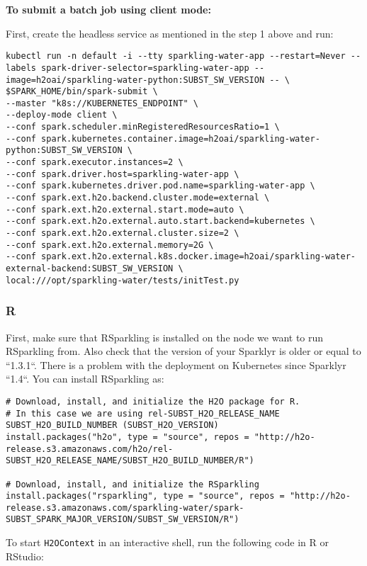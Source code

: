 \textbf{To submit a batch job using client mode:}

First, create the headless service as mentioned in the step 1 above and run:

\begin{lstlisting}[style=Bash]
kubectl run -n default -i --tty sparkling-water-app --restart=Never --labels spark-driver-selector=sparkling-water-app --image=h2oai/sparkling-water-python:SUBST_SW_VERSION -- \
$SPARK_HOME/bin/spark-submit \
--master "k8s://KUBERNETES_ENDPOINT" \
--deploy-mode client \
--conf spark.scheduler.minRegisteredResourcesRatio=1 \
--conf spark.kubernetes.container.image=h2oai/sparkling-water-python:SUBST_SW_VERSION \
--conf spark.executor.instances=2 \
--conf spark.driver.host=sparkling-water-app \
--conf spark.kubernetes.driver.pod.name=sparkling-water-app \
--conf spark.ext.h2o.backend.cluster.mode=external \
--conf spark.ext.h2o.external.start.mode=auto \
--conf spark.ext.h2o.external.auto.start.backend=kubernetes \
--conf spark.ext.h2o.external.cluster.size=2 \
--conf spark.ext.h2o.external.memory=2G \
--conf spark.ext.h2o.external.k8s.docker.image=h2oai/sparkling-water-external-backend:SUBST_SW_VERSION \
local:///opt/sparkling-water/tests/initTest.py
\end{lstlisting}

\subsubsection{R}

First, make sure that RSparkling is installed on the node we want to run RSparkling from.  Also check that the version
of your Sparklyr is older or equal to ``1.3.1``. There is a problem with the deployment on Kubernetes since Sparklyr ``1.4``.
You can install RSparkling as:

\begin{lstlisting}[style=R]
# Download, install, and initialize the H2O package for R.
# In this case we are using rel-SUBST_H2O_RELEASE_NAME SUBST_H2O_BUILD_NUMBER (SUBST_H2O_VERSION)
install.packages("h2o", type = "source", repos = "http://h2o-release.s3.amazonaws.com/h2o/rel-SUBST_H2O_RELEASE_NAME/SUBST_H2O_BUILD_NUMBER/R")

# Download, install, and initialize the RSparkling
install.packages("rsparkling", type = "source", repos = "http://h2o-release.s3.amazonaws.com/sparkling-water/spark-SUBST_SPARK_MAJOR_VERSION/SUBST_SW_VERSION/R")
\end{lstlisting}

To start \texttt{H2OContext} in an interactive shell, run the following code in R or RStudio:

